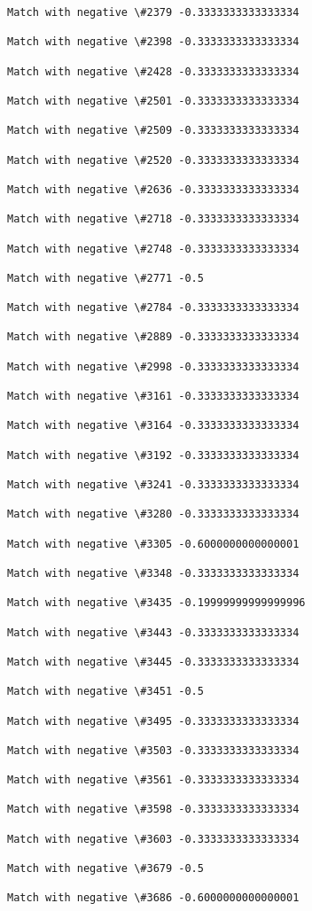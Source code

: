 \documentclass[11pt]{article}
\begin{document}
\begin{Verbatim}[commandchars=\\\{\}]
Match with negative \#2379 -0.3333333333333334

Match with negative \#2398 -0.3333333333333334

Match with negative \#2428 -0.3333333333333334

Match with negative \#2501 -0.3333333333333334

Match with negative \#2509 -0.3333333333333334

Match with negative \#2520 -0.3333333333333334

Match with negative \#2636 -0.3333333333333334

Match with negative \#2718 -0.3333333333333334

Match with negative \#2748 -0.3333333333333334

Match with negative \#2771 -0.5

Match with negative \#2784 -0.3333333333333334

Match with negative \#2889 -0.3333333333333334

Match with negative \#2998 -0.3333333333333334

Match with negative \#3161 -0.3333333333333334

Match with negative \#3164 -0.3333333333333334

Match with negative \#3192 -0.3333333333333334

Match with negative \#3241 -0.3333333333333334

Match with negative \#3280 -0.3333333333333334

Match with negative \#3305 -0.6000000000000001

Match with negative \#3348 -0.3333333333333334

Match with negative \#3435 -0.19999999999999996

Match with negative \#3443 -0.3333333333333334

Match with negative \#3445 -0.3333333333333334

Match with negative \#3451 -0.5

Match with negative \#3495 -0.3333333333333334

Match with negative \#3503 -0.3333333333333334

Match with negative \#3561 -0.3333333333333334

Match with negative \#3598 -0.3333333333333334

Match with negative \#3603 -0.3333333333333334

Match with negative \#3679 -0.5

Match with negative \#3686 -0.6000000000000001


\end{Verbatim}
\end{document}
